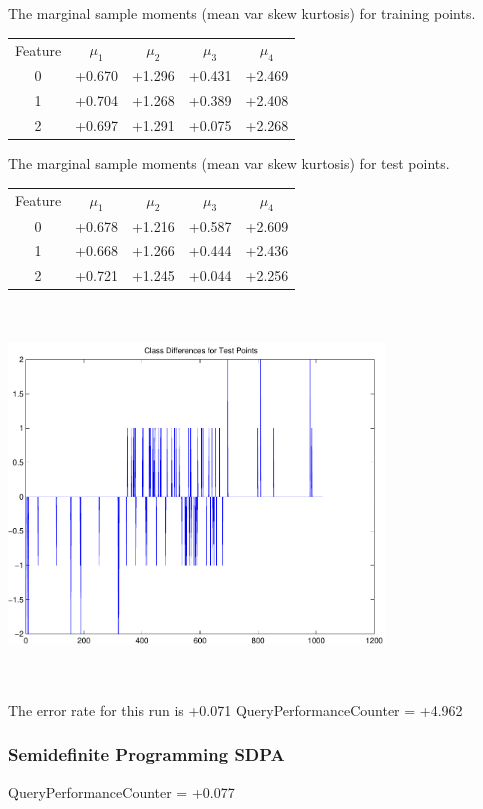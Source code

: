 \documentclass[9pt]{article}
\theoremstyle{plain}
\theoremstyle{definition}
\theoremstyle{remark}
\numberwithin{equation}{section}
\begin{document}
The marginal sample moments (mean var skew kurtosis) for training points.\newline
\begin{tabular}{ c |  c  c  c  c}
Feature & $\mu_1$ & $\mu_2$ & $\mu_3$ & $\mu_4$ \\
0 & +0.670 & +1.296 & +0.431& +2.469 \\
\hline
1 & +0.704 & +1.268 & +0.389& +2.408 \\
\hline
2 & +0.697 & +1.291 & +0.075& +2.268 \\
\hline
\end{tabular}
\newline
The marginal sample moments (mean var skew kurtosis) for test points.\newline
\begin{tabular}{ c | c  c  c  c}
Feature & $\mu_1$ & $\mu_2$ & $\mu_3$ & $\mu_4$ \\
0 & +0.678 & +1.216 & +0.587& +2.609\\
\hline
1 & +0.668 & +1.266 & +0.444& +2.436\\
\hline
2 & +0.721 & +1.245 & +0.044& +2.256\\
\hline
\end{tabular}\newline
\includegraphics[width=10.0cm,height=10.0cm]{classDiffs.pdf}

The error rate for this run is +0.071\newline
QueryPerformanceCounter  =  +4.962
\subsubsection{Semidefinite Programming SDPA}
QueryPerformanceCounter  =  +0.077
\end{document}
